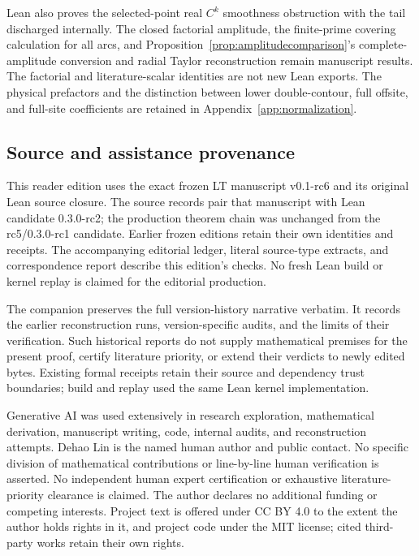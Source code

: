 \documentclass[11pt]{article}
\numberwithin{equation}{section}
\theoremstyle{definition}
\begin{document}
Lean also proves the selected-point real \(C^k\) smoothness
obstruction with the tail discharged internally. The closed factorial
amplitude, the finite-prime covering calculation for all arcs, and
Proposition~\ref{prop:amplitudecomparison}'s complete-amplitude conversion
and radial Taylor reconstruction remain manuscript results. The
factorial and literature-scalar identities are not new Lean exports.
The physical prefactors and the distinction between lower
 double-contour, full offsite, and full-site coefficients are retained
in Appendix~\ref{app:normalization}.

\subsection{Source and assistance provenance}
This reader edition uses the exact frozen LT manuscript v0.1-rc6 and
its original Lean source closure. The source records pair that
manuscript with Lean candidate 0.3.0-rc2; the production theorem chain
was unchanged from the rc5/0.3.0-rc1 candidate. Earlier frozen editions
retain their own identities and receipts. The accompanying editorial
ledger, literal source-type extracts, and correspondence report describe
this edition's checks. No fresh Lean build or kernel replay is claimed
for the editorial production.

The companion  preserves the full
version-history narrative verbatim. It records the earlier
reconstruction runs, version-specific audits, and the limits of their
verification. Such historical reports do not supply mathematical
premises for the present proof, certify literature priority, or extend
their verdicts to newly edited bytes. Existing formal receipts retain
their source and dependency trust boundaries; build and replay used the
same Lean kernel implementation.

Generative AI was used extensively in research exploration,
mathematical derivation, manuscript writing, code, internal audits,
and reconstruction attempts. Dehao Lin is the named human author
and public contact. No specific division of mathematical contributions
or line-by-line human verification is asserted. No independent human
expert certification or exhaustive literature-priority clearance is
claimed. The author declares no additional funding or competing
interests. Project text is offered under CC BY 4.0 to the extent the
author holds rights in it, and project code under the MIT license;
cited third-party works retain their own rights.
\end{document}
